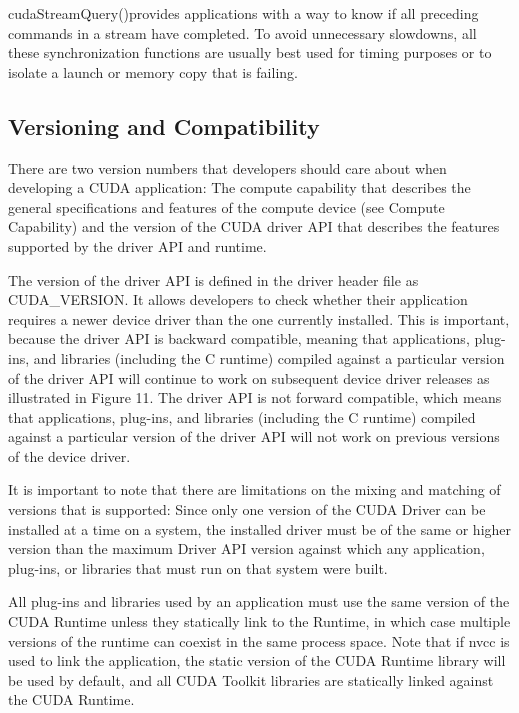 \documentclass[openany]{book}
\begin{document}
cudaStreamQuery()provides applications with a way to know if all preceding 
commands in a stream have completed. To avoid unnecessary slowdowns, all these 
synchronization functions are usually best used for timing purposes or to 
isolate a launch or memory copy that is failing.



\subsection{Versioning and Compatibility}%
There are two version numbers that developers should care about when developing 
a CUDA application: The compute capability that describes the general 
specifications and features of the compute device (see Compute Capability) and 
the version of the CUDA driver API that describes the features supported by the 
driver API and runtime.

The version of the driver API is defined in the driver header file as 
CUDA\_VERSION. It allows developers to check whether their application requires 
a newer device driver than the one currently installed. This is important, 
because the driver API is backward compatible, meaning that applications, 
plug-ins, and libraries (including the C runtime) compiled against a particular 
version of the driver API will continue to work on subsequent device driver 
releases as illustrated in Figure 11. The driver API is not forward compatible, 
which means that applications, plug-ins, and libraries (including the C runtime) 
compiled against a particular version of the driver API will not work on 
previous versions of the device driver.

It is important to note that there are limitations on the mixing and matching of 
versions that is supported:
Since only one version of the CUDA Driver can be installed at a time on a 
system, the installed driver must be of the same or higher version than the 
maximum Driver API version against which any application, plug-ins, or libraries 
that must run on that system were built.

All plug-ins and libraries used by an application must use the same version of 
the CUDA Runtime unless they statically link to the Runtime, in which case 
multiple versions of the runtime can coexist in the same process space. Note 
that if nvcc is used to link the application, the static version of the CUDA 
Runtime library will be used by default, and all CUDA Toolkit libraries are 
statically linked against the CUDA Runtime.
\end{document}

